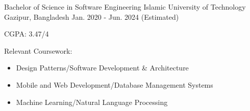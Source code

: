 

\begin{cventries}

  \cventry
    {Bachelor of Science in Software Engineering} %
    {Islamic University of Technology} %
    {Gazipur, Bangladesh} %
    {Jan. 2020 - Jun. 2024 (Estimated)} %
    {
      \begin{cvitems} %
        \item CGPA: 3.47/4
        \item Relevant Coursework: \begin{itemize}[noitemsep]
               \item Design Patterns/Software Development \& Architecture
               \item Mobile and Web Development/Database Management Systems
               \item Machine Learning/Natural Language Processing
              \end{itemize}
      \end{cvitems}
    }

\end{cventries}
